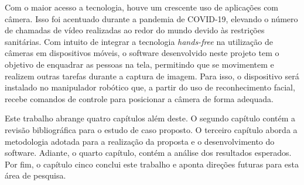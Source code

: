 Com o maior acesso a tecnologia, houve um crescente uso de aplicações com câmera. Isso foi acentuado durante a pandemia de COVID-19, elevando o número de chamadas de vídeo realizadas ao redor do mundo devido às restrições sanitárias. Com intuito de integrar a tecnologia \textit{hands-free} na utilização de câmeras em dispositivos móveis, o software desenvolvido neste projeto tem o objetivo de enquadrar as pessoas na tela, permitindo que se movimentem e realizem outras tarefas durante a captura de imagem. Para isso, o dispositivo será instalado no manipulador robótico que, a partir do uso de reconhecimento facial, recebe comandos de controle para posicionar a câmera de forma adequada.

Este trabalho abrange quatro capítulos além deste. O segundo capítulo contém a revisão bibliográfica para o estudo de caso proposto. O terceiro capítulo aborda a metodologia adotada para a realização da proposta e o desenvolvimento do software. Adiante, o quarto capítulo, contém a análise dos resultados esperados. Por fim, o capítulo cinco conclui este trabalho e aponta direções futuras para esta área de pesquisa.


